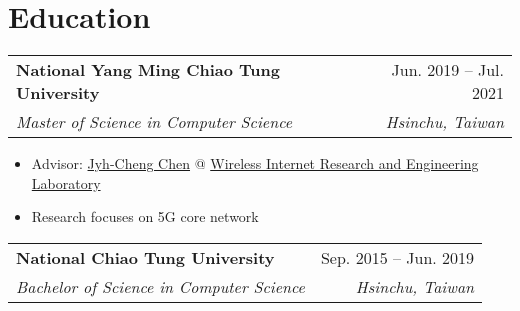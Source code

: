 \documentclass[letterpaper,11pt]{article}
\makeatletter
\newcommand{\resumeItemTwo}[1]{
  \item\small{
    {#1 \vspace{-2pt}}
  }
}
\newcommand{\resumeSubheading}[4]{
  \vspace{1pt}%
    \begin{tabular*}{0.97\textwidth}{l@{\extracolsep{\fill}}r}
      \textbf{#1} & #2 \\
      \textit{\small#3} & \textit{\small #4} \\
    \end{tabular*}\vspace{-5pt}
}
\newcommand{\resumeSubHeadingListStart}{}%
\newcommand{\resumeSubHeadingListEnd}{}%
\newcommand{\resumeItemListStart}{\begin{itemize}}
\newcommand{\resumeItemListEnd}{\end{itemize}\vspace{-5pt}}
\makeatother
\begin{document}
\section{Education}
  \resumeSubHeadingListStart
    \resumeSubheading
      {National Yang Ming Chiao Tung University}{Jun. 2019 -- Jul. 2021}
      {Master of Science in Computer Science}{Hsinchu, Taiwan}
      \resumeItemListStart
        \resumeItemTwo{Advisor: \href{https://people.cs.nctu.edu.tw/~jcc/}{Jyh-Cheng Chen} @ \href{http://wire.cs.nctu.edu.tw/}{Wireless Internet Research and Engineering Laboratory}}
        \resumeItemTwo{Research focuses on 5G core network}
      \resumeItemListEnd
    \resumeSubheading
      {National Chiao Tung University}{Sep. 2015 -- Jun. 2019}
      {Bachelor of Science in Computer Science}{Hsinchu, Taiwan}
  \resumeSubHeadingListEnd
  
\end{document}
